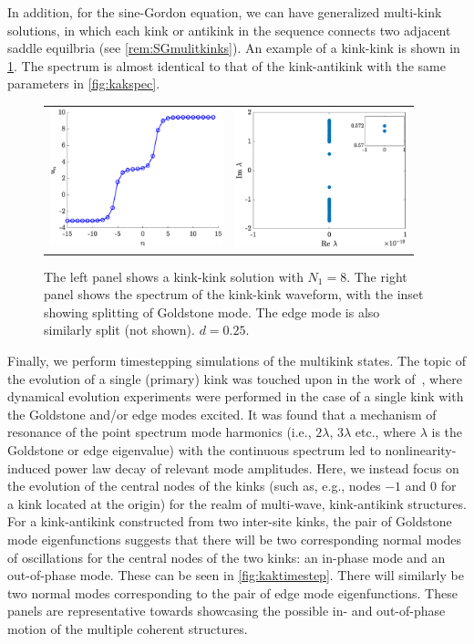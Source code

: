 \documentclass[12pt,reqno]{amsart}
\def\noi{\noindent}
\begin{document}
\noi In addition, for the sine-Gordon equation, we can have generalized multi-kink solutions, in which each kink or antikink in the sequence connects two adjacent saddle equilbria (see \cref{rem:SGmulitkinks}). An example of a kink-kink is shown in \cref{fig:kk50}. The spectrum is almost identical to that of the kink-antikink with the same parameters in \cref{fig:kakspec}.
\begin{figure}[H]
	\begin{center}
	\begin{tabular}{cc}
	\includegraphics[width=5cm]{kk50.eps} &
	\includegraphics[width=5cm]{kk50spec.eps}
	\end{tabular}
	\end{center}
	\caption{The left panel shows a kink-kink solution with $N_1 = 8$. The right panel shows the spectrum of the kink-kink waveform, with the inset showing splitting of Goldstone mode. The edge mode is also similarly 
	split (not shown). $d = 0.25$. }
	\label{fig:kk50}
\end{figure}

Finally, we perform timestepping simulations of the multikink
states. The topic of the evolution of
a single (primary) kink was touched upon in the work
of~\cite{KevrekidisWeinstein2000}, where dynamical
evolution experiments were performed in the case
of a single kink with the Goldstone and/or edge
modes excited. It was found that a mechanism of
resonance of the point spectrum mode harmonics
(i.e., $2 \lambda$, $3 \lambda$ etc., 
where $\lambda$ is the Goldstone
or edge eigenvalue) with the continuous spectrum
led to nonlinearity-induced power law decay of
relevant mode amplitudes. Here, we instead focus on the evolution
of the central nodes of the kinks (such as, e.g., nodes
$-1$ and $0$ for a kink located at the origin) for the
realm of multi-wave, kink-antikink structures.
For a kink-antikink constructed from two inter-site kinks, the pair of Goldstone mode eigenfunctions suggests that there will be two corresponding normal modes of oscillations for the central nodes of the two kinks: an in-phase mode and an out-of-phase mode. These can be seen in \cref{fig:kaktimestep}. There will similarly be two normal modes corresponding to the pair of edge mode eigenfunctions.
These panels are representative towards showcasing
the possible in- and out-of-phase motion of the multiple 
coherent structures.
\end{document}
